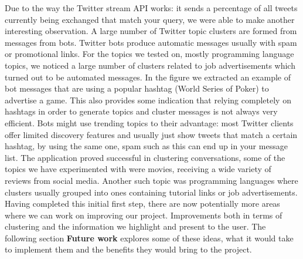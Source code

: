 \newline
Due to the way the Twitter stream API works: it sends a percentage of all tweets currently being exchanged that match your query, we were able to make another interesting observation. A large number of Twitter topic clusters are formed from messages from bots. Twitter bots produce automatic messages usually with spam or promotional links. For the topics we tested on, mostly programming language topics, we noticed a large number of clusters related to job advertisements which turned out to be automated messages.
\newline
In the figure we extracted an example of bot messages that are using a popular hashtag (World Series of Poker) to advertise a game. This also provides some indication that relying completely on hashtags in order to generate topics and cluster messages is not always very efficient. Bots might use trending topics to their advantage: most Twitter clients offer limited discovery features and usually just show tweets that match a certain hashtag, by using the same one, spam such as this can end up in your message list.
\newline
The application proved successful in clustering conversations, some of the topics we have experimented with were movies, receiving a wide variety of reviews from social media. Another such topic was programming languages where clusters usually grouped into ones containing tutorial links or job advertisements.
\newline
\newline
Having completed this initial first step, there are now potentially more areas where we can work on improving our project. Improvements both in terms of clustering and the information we highlight and present to the user. The following section \textbf{Future work} explores some of these ideas, what it would take to implement them and the benefits they would bring to the project.